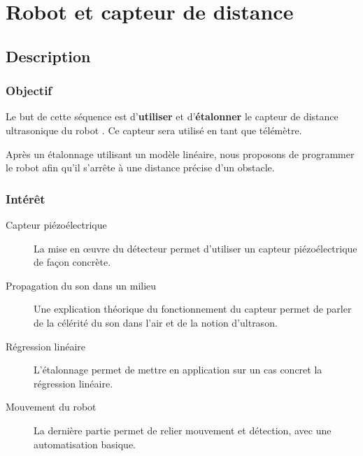 \section{Robot \mq et capteur de distance}

\pagestyle{mq}

\subsection{Description}

\subsubsection{Objectif}

\begin{formule}
Le but de cette séquence est d’\textbf{utiliser} et d'\textbf{étalonner} le capteur de distance ultrasonique du robot \mq. Ce capteur sera utilisé en tant que télémètre.

Après un étalonnage utilisant un modèle linéaire, nous proposons de programmer le robot afin qu'il  s’arrête à une distance précise d’un obstacle.
\end{formule}


\subsubsection{Intérêt}


\begin{description}
    \item [Capteur piézoélectrique] La mise en œuvre du détecteur permet d’utiliser un capteur piézoélectrique de façon concrète.
    \item [Propagation du son dans un milieu] Une explication théorique du fonctionnement du capteur permet de parler de la célérité du son dans l’air et de la notion d’ultrason.
    \item [Régression linéaire] L’étalonnage permet de mettre en application sur un cas concret la régression linéaire.
    \item [Mouvement du robot] La dernière partie permet de relier mouvement et détection, avec une automatisation basique. 
\end{description}


